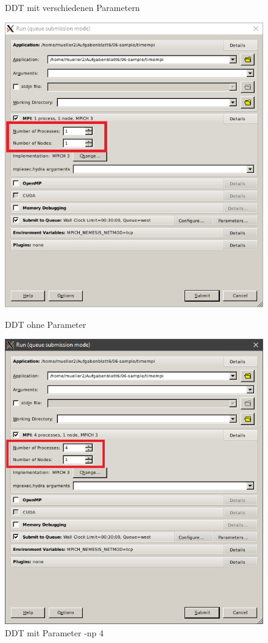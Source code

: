 \documentclass[12pt]{article}
\begin{document}
\begin{sloppypar}
\begin{figure}[htbp]
    \caption{DDT mit verschiedenen Parametern}
    \begin{minipage}[t]{0.5\textwidth}
        \includegraphics[width=\textwidth]{res/ddt-no-parameter.PNG}
        \caption*{DDT ohne Parameter}
    \end{minipage}
    \begin{minipage}[t]{0.5\textwidth}
        \includegraphics[width=\textwidth]{res/ddt-with-parameter.PNG}
        \caption*{DDT mit Parameter -np 4}
    \end{minipage}
\end{figure}



\end{sloppypar}
\end{document}
